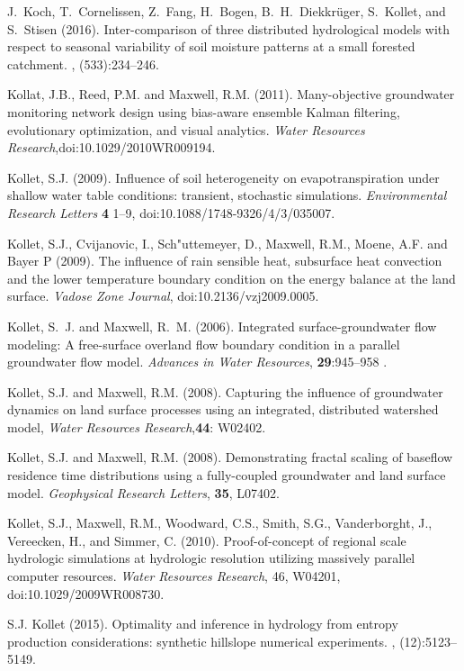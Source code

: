 \begin{thebibliography}{999}
J.~Koch, T.~Cornelissen, Z.~Fang, H.~Bogen, B.~H.~Diekkr{\"u}ger, S.~Kollet,
and S.~Stisen (2016).
\newblock Inter-comparison of three distributed hydrological models with
  respect to seasonal variability of soil moisture patterns at a small forested
  catchment.
, (533):234--246.


Kollat, J.B., Reed, P.M. and Maxwell, R.M. (2011). Many-objective groundwater monitoring network design using bias-aware ensemble Kalman filtering, evolutionary optimization, and visual analytics. {\em Water Resources Research},doi:10.1029/2010WR009194.

Kollet, S.J. (2009). Influence of soil heterogeneity on evapotranspiration under shallow water table conditions: transient, stochastic simulations. {\em Environmental Research Letters} {\bf 4} 1--9, doi:10.1088/1748-9326/4/3/035007.

Kollet, S.J., Cvijanovic, I., Sch{\a"u}ttemeyer, D., Maxwell, R.M., Moene, A.F. and Bayer P (2009). The influence of rain sensible heat, subsurface heat convection and the lower temperature boundary condition on the energy balance at the land surface. {\em Vadose Zone Journal}, doi:10.2136/vzj2009.0005.

Kollet, S.~J. and Maxwell, R.~M. (2006). Integrated
surface-groundwater flow
  modeling: A free-surface overland flow boundary condition in a parallel
  groundwater flow model. {\em Advances in Water Resources}, {\bf 29}:945--958 .

Kollet, S.J. and Maxwell, R.M. (2008). Capturing the influence of groundwater dynamics on land surface processes using an integrated, distributed watershed model, { \em Water Resources Research},{\bf 44}: W02402.

Kollet, S.J. and Maxwell, R.M. (2008). Demonstrating fractal scaling of baseflow residence time distributions using a fully-coupled groundwater and land surface model. {\em Geophysical Research Letters}, {\bf 35}, L07402. 

Kollet, S.J., Maxwell, R.M., Woodward, C.S., Smith, S.G., Vanderborght, J., Vereecken, H., and Simmer, C. (2010). Proof-of-concept of regional scale hydrologic simulations at hydrologic resolution utilizing massively parallel computer resources. {\em Water Resources Research}, 46, W04201, doi:10.1029/2009WR008730.

	S.J. Kollet (2015).
\newblock Optimality and inference in hydrology from entropy production
  considerations: synthetic hillslope numerical experiments.
, (12):5123--5149.



\end{thebibliography}
